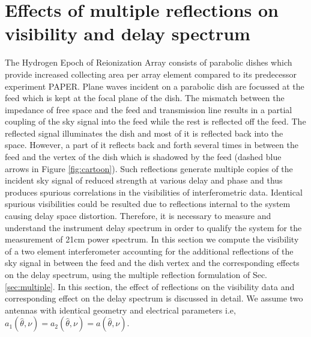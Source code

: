 \documentclass[twocolumn]{emulateapj}
\newcommand{\bmvolt}{{a}}
\newcommand{\thhat}{{\hat\theta}}
\begin{document}
\section{\textbf{Effects of multiple reflections on visibility and delay spectrum}}
The Hydrogen Epoch of Reionization Array consists of parabolic dishes which provide increased collecting area per array element compared to its predecessor experiment PAPER. Plane waves incident on a parabolic dish are focussed at the feed which is kept at the focal plane of the dish.
The mismatch between the impedance of free space and the feed and transmission line results in a partial coupling of the sky signal into the feed while the rest is reflected off the feed. 
The reflected signal illuminates the dish and most of it is reflected back into the space.
However, a part of it reflects back and forth several times in between the feed and the vertex of the dish which is shadowed by the feed (dashed blue arrows in Figure \ref{fig:cartoon}).
Such reflections generate multiple copies of the incident sky signal of reduced strength at various delay and phase and thus produces spurious correlations in the visibilities of interferometric data.  Identical spurious visibilities could be resulted due to reflections internal to the system causing delay space distortion. Therefore, it is necessary to measure and understand the instrument delay spectrum in order to qualify the system for the measurement of 21cm power spectrum. 
In this section we compute the visibility of a two element interferometer accounting for the additional reflections of the sky signal in between the feed and the dish vertex and the corresponding effects on the delay spectrum, using the multiple reflection formulation of Sec. \ref{sec:multiple}. In this section, the effect of reflections on the visibility data and corresponding effect on the delay spectrum is discussed in detail. We assume two antennas with identical geometry and electrical parameters i.e, $\bmvolt_{1}(\thhat,\nu)=\bmvolt_{2}(\thhat,\nu) = \bmvolt(\thhat,\nu)$. 
\end{document}
